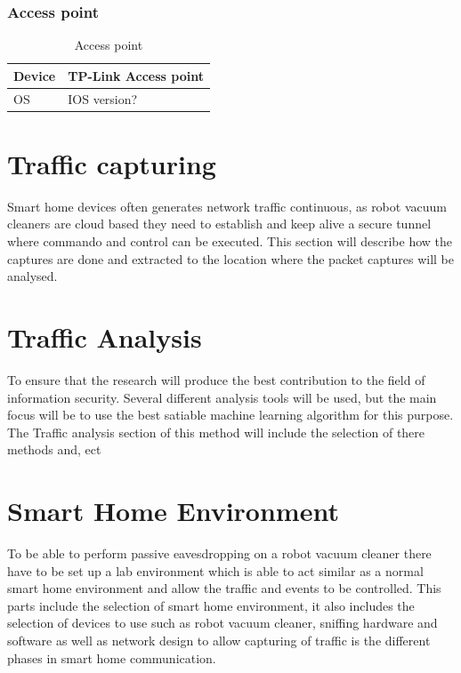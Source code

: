 \subsubsection{Access point}

\begin{table}[!hbtp]
\centering
\caption{Access point}
    \begin{tabular}{|l|l|}
    \hline
        Device & TP-Link Access point \\ \hline
        OS     & IOS version?         \\ \hline
    \end{tabular}
\end{table}


\section{Traffic capturing}
Smart home devices often generates network traffic continuous, as robot vacuum cleaners are cloud based they need to establish and keep alive a secure tunnel where commando and control can be executed. This section will describe how the captures are done and extracted to the location where the packet captures will be analysed. 

\section{Traffic Analysis}
To ensure that the research will produce the best contribution to the field of information security. Several different analysis tools will be used, but the main focus will be to use the best satiable machine learning algorithm for this purpose. The Traffic analysis section of this method will include the selection of there methods and, ect    

\section{Smart Home Environment}
To be able to perform passive eavesdropping on a robot vacuum cleaner there have to be set up a lab environment which is able to act similar as a normal smart home environment and allow the traffic and events to be controlled. This parts include the selection of smart home environment, it also includes the selection of devices to use such as robot vacuum cleaner, sniffing hardware and software as well as network design to allow capturing of traffic is the different phases in smart home communication. 

